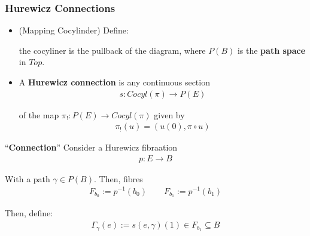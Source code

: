 \documentclass[Total.tex]{subfiles}
\begin{document}
				\subsubsection{Hurewicz Connections}
					\begin{Def}
						\begin{itemize}
							\item (Mapping Cocylinder) Define:
							\begin{center}
							\end{center}
							
							the cocyliner is the pullback of the diagram, where $P(B)$ is the \textbf{path space} in $Top$.
							
							\item A \textbf{Hurewicz connection} is any continuous section
							\begin{gather*}
								s:Cocyl(\pi)\rightarrow P(E)
							\end{gather*}
							
							of the map $\pi_!:P(E)\rightarrow Cocyl(\pi)$ given by
							\begin{gather*}
								\pi_!(u)=(u(0),\pi\circ u)
							\end{gather*}
						\end{itemize}
						
					
					\end{Def}
					
					“\textbf{Connection}” Consider a Hurewicz fibraation 
					\begin{gather*}
						p:E\rightarrow B
					\end{gather*}
					
					With a path $\gamma\in P(B)$. Then, fibres
					\begin{gather*}
						F_{b_0}:=p^{-1}(b_0)\qquad F_{b_1}:=p^{-1}(b_1)
					\end{gather*}
					
					Then, define:
					\begin{gather*}
						\Gamma_\gamma(e):=s(e,\gamma)(1)\in F_{b_1}\subseteq B
					\end{gather*}
\end{document}
